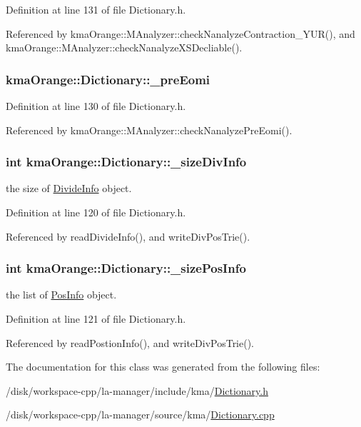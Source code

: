 Definition at line 131 of file Dictionary.h.

Referenced by kmaOrange::MAnalyzer::checkNanalyzeContraction\_\-YUR(), and kmaOrange::MAnalyzer::checkNanalyzeXSDecliable().\hypertarget{classkmaOrange_1_1Dictionary_045a8ea9b9c9e65014bb75c9b7a37212}{
\subsubsection[{\_\-preEomi}]{ {\bf kmaOrange::Dictionary::\_\-preEomi}}}
\label{classkmaOrange_1_1Dictionary_045a8ea9b9c9e65014bb75c9b7a37212}




Definition at line 130 of file Dictionary.h.

Referenced by kmaOrange::MAnalyzer::checkNanalyzePreEomi().\hypertarget{classkmaOrange_1_1Dictionary_dd2dc5534bc25b629ad4f99433afbbe5}{
\subsubsection[{\_\-sizeDivInfo}]{\setlength{\rightskip}{0pt plus 5cm}int {\bf kmaOrange::Dictionary::\_\-sizeDivInfo}}}
\label{classkmaOrange_1_1Dictionary_dd2dc5534bc25b629ad4f99433afbbe5}


the size of \hyperlink{classDivideInfo}{DivideInfo} object. 



Definition at line 120 of file Dictionary.h.

Referenced by readDivideInfo(), and writeDivPosTrie().\hypertarget{classkmaOrange_1_1Dictionary_29cf18a61b8ae3d5d6122d0749ceb93f}{
\subsubsection[{\_\-sizePosInfo}]{\setlength{\rightskip}{0pt plus 5cm}int {\bf kmaOrange::Dictionary::\_\-sizePosInfo}}}
\label{classkmaOrange_1_1Dictionary_29cf18a61b8ae3d5d6122d0749ceb93f}


the list of \hyperlink{classPosInfo}{PosInfo} object. 



Definition at line 121 of file Dictionary.h.

Referenced by readPostionInfo(), and writeDivPosTrie().

The documentation for this class was generated from the following files:\begin{CompactItemize}
\item 
/disk/workspace-cpp/la-manager/include/kma/\hyperlink{Dictionary_8h}{Dictionary.h}\item 
/disk/workspace-cpp/la-manager/source/kma/\hyperlink{Dictionary_8cpp}{Dictionary.cpp}\end{CompactItemize}
